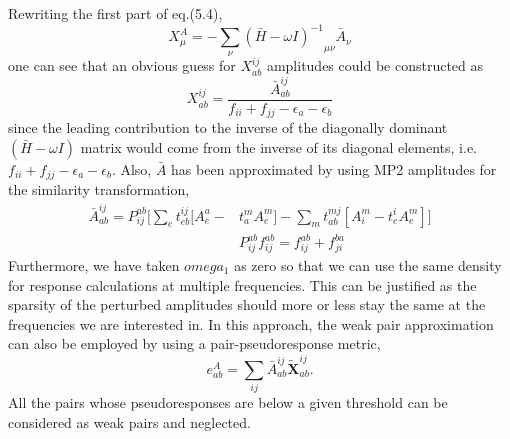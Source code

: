 Rewriting the first part of eq.(5.4),
\begin{equation}
X_{\mu}^{A} = -\sum_{\nu}{{(\bar{H} - \omega I)}^{-1}}_{\mu\nu}\bar{A}_{\nu}
\end{equation}
one can see that an obvious guess for $X^{ij}_{ab}$ amplitudes could be constructed as
\begin{equation}
X^{ij}_{ab} =  \frac{\bar{A}^{ij}_{ab}}{f_{ii} + f_{jj} - \epsilon_a - \epsilon_b} 
\end{equation} 
since the leading contribution to the inverse of the diagonally dominant $(\bar{H} - \omega I)$ matrix 
would come from the inverse of its diagonal elements, i.e. $f_{ii} + f_{jj} - \epsilon_a - \epsilon_b$. 
Also, $\bar{A}$ has been approximated by using MP2 amplitudes for the similarity transformation,
\begin{equation}
\begin{split}
\bar{A}^{ij}_{ab} = P_{ij}^{ab}\bigg[\sum_e t^{ij}_{eb}[A^a_e - & t^m_a A^m_e] -\sum_m t^{mj}_{ab}[A^m_i - t^i_e A^m_e]\bigg] \\
& P_{ij}^{ab} f_{ij}^{ab}  = f_{ij}^{ab} + f_{ji}^{ba}
\end{split}
\end{equation}
Furthermore, we have taken $omega_1$ as zero so that we can use the same density for response calculations at
multiple frequencies. This can be justified as the sparsity of the perturbed amplitudes should more or less
stay the same at the frequencies we are interested in. In this approach, the weak pair approximation can also 
be employed by using a pair-pseudoresponse metric,
\begin{equation}
e^{A}_{ab} =  \sum_{ij} \bar{A}^{ij}_{ab}\bm{\tilde{X}}^{ij}_{ab}.
\end{equation}
All the pairs whose pseudoresponses are below a given threshold can be considered as weak pairs and neglected. 
